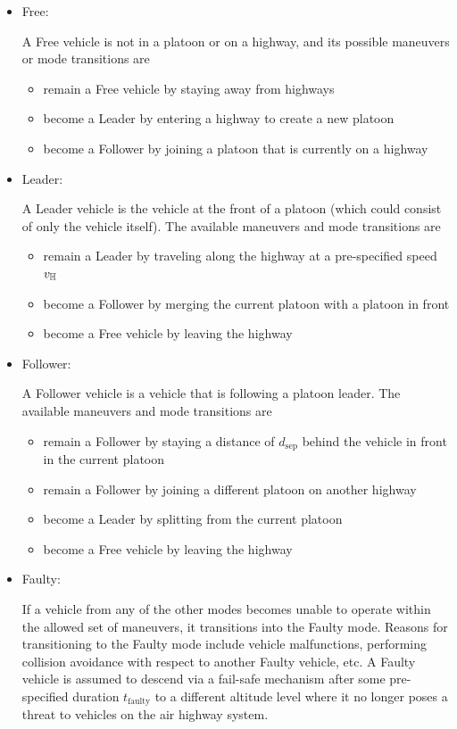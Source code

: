\begin{itemize}
\item Free: 

A Free vehicle is not in a platoon or on a highway, and its possible maneuvers or mode transitions are
\begin{itemize}
\item remain a Free vehicle by staying away from highways
\item become a Leader by entering a highway to create a new platoon
\item become a Follower by joining a platoon that is currently on a highway
\end{itemize} 

\item Leader: 

A Leader vehicle is the vehicle at the front of a platoon (which could consist of only the vehicle itself). The available maneuvers and mode transitions are

\begin{itemize}
\item remain a Leader by traveling along the highway at a pre-specified speed $v_{\mathbb{H}}$
\item become a Follower by merging the current platoon with a platoon in front
\item become a Free vehicle by leaving the highway
\end{itemize}

\item Follower: 

A Follower vehicle is a vehicle that is following a platoon leader. The available maneuvers and mode transitions are 

\begin{itemize}
\item remain a Follower by staying a distance of $d_\text{sep}$ behind the vehicle in front in the current platoon
\item remain a Follower by joining a different platoon on another highway
\item become a Leader by splitting from the current platoon
\item become a Free vehicle by leaving the highway
\end{itemize}

\item Faulty: 

If a vehicle from any of the other modes becomes unable to operate within the allowed set of maneuvers, it transitions into the Faulty mode. Reasons for transitioning to the Faulty mode include vehicle malfunctions, performing collision avoidance with respect to another Faulty vehicle, etc. A Faulty vehicle is assumed to descend via a fail-safe mechanism after some pre-specified duration $t_\text{faulty}$ to a different altitude level where it no longer poses a threat to vehicles on the air highway system. 
\end{itemize}

